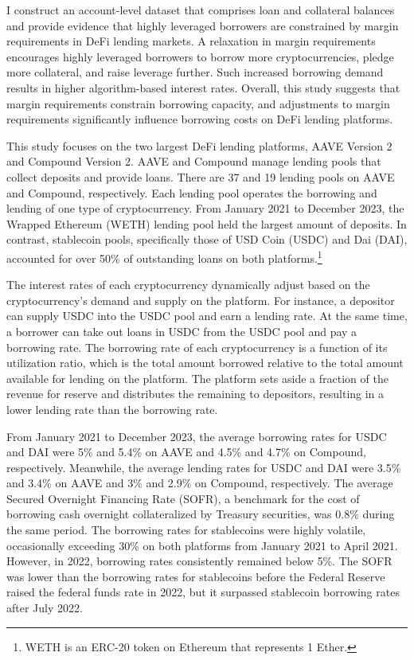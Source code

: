 \documentclass[12pt]{article}
\begin{document}
I construct an account-level dataset that comprises loan and collateral balances and provide evidence that highly leveraged borrowers are constrained by margin requirements in DeFi lending markets. A relaxation in margin requirements encourages highly leveraged borrowers to borrow more cryptocurrencies, pledge more collateral, and raise leverage further. Such increased borrowing demand results in higher algorithm-based interest rates. Overall, this study suggests that margin requirements constrain borrowing capacity, and adjustments to margin requirements significantly influence borrowing costs on DeFi lending platforms.
  
This study focuses on the two largest DeFi lending platforms, AAVE Version 2 and Compound Version 2. AAVE and Compound manage lending pools that collect deposits and provide loans. There are 37 and 19 lending pools on AAVE and Compound, respectively. Each lending pool operates the borrowing and lending of one type of cryptocurrency. From January 2021 to December 2023, the Wrapped Ethereum (WETH) lending pool held the largest amount of deposits. In contrast, stablecoin pools, specifically those of USD Coin (USDC) and Dai (DAI), accounted for over 50\% of outstanding loans on both platforms.\footnote{WETH is an ERC-20 token on Ethereum that represents 1 Ether.}

The interest rates of each cryptocurrency dynamically adjust based on the cryptocurrency's demand and supply on the platform. For instance, a depositor can supply USDC into the USDC pool and earn a lending rate. At the same time, a borrower can take out loans in USDC from the USDC pool and pay a borrowing rate. The borrowing rate of each cryptocurrency is a function of its utilization ratio, which is the total amount borrowed relative to the total amount available for lending on the platform. The platform sets aside a fraction of the revenue for reserve and distributes the remaining to depositors, resulting in a lower lending rate than the borrowing rate.

From January 2021 to December 2023, the average borrowing rates for USDC and DAI were 5\% and 5.4\% on AAVE and 4.5\% and 4.7\% on Compound, respectively. Meanwhile, the average lending rates for USDC and DAI were 3.5\% and 3.4\% on AAVE and 3\% and 2.9\% on Compound, respectively. The average Secured Overnight Financing Rate (SOFR), a benchmark for the cost of borrowing cash overnight collateralized by Treasury securities, was 0.8\% during the same period. The borrowing rates for stablecoins were highly volatile, occasionally exceeding 30\% on both platforms from January 2021 to April 2021. However, in 2022, borrowing rates consistently remained below 5\%. The SOFR was lower than the borrowing rates for stablecoins before the Federal Reserve raised the federal funds rate in 2022, but it surpassed stablecoin borrowing rates after July 2022.
\end{document}
